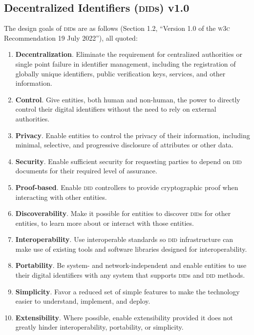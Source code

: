 \documentclass[twoside]{article}
\begin{document}
\subsection{Decentralized Identifiers (\textsc{did}s) v1.0}

The design goals of \textsc{did}s are as follows (Section 1.2, ``Version 1.0 of the \textsc{w3c} Recommendation 19 July 2022''), all quoted:

\begin{enumerate}
  \item  \sloppy \textbf{Decentralization}. Eliminate the requirement for centralized authorities or single point failure in identifier management, including the registration of globally unique identifiers, public verification keys, services, and other information.
  \item  \textbf{Control}. Give entities, both human and non-human, the power to directly control their digital identifiers without the need to rely on external authorities.
  \item  \textbf{Privacy}. Enable entities to control the privacy of their information, including minimal, selective, and progressive disclosure of attributes or other data.
  \item  \textbf{Security}. Enable sufficient security for requesting parties to depend on \textsc{did} documents for their required level of assurance.
  \item  \textbf{Proof-based}. Enable \textsc{did} controllers to provide cryptographic proof when interacting with other entities.
  \item  \textbf{Discoverability}. Make it possible for entities to discover \textsc{did}s for other entities, to learn more about or interact with those entities.
  \item  \textbf{Interoperability}. Use interoperable standards so \textsc{did} infrastructure can make use of existing tools and software libraries designed for interoperability.
  \item  \textbf{Portability}. Be system- and network-independent and enable entities to use their digital identifiers with any system that supports \textsc{did}s and \textsc{did} methods.
  \item  \textbf{Simplicity}. Favor a reduced set of simple features to make the technology easier to understand, implement, and deploy.
  \item  \textbf{Extensibility}. Where possible, enable extensibility provided it does not greatly hinder interoperability, portability, or simplicity.
\end{enumerate}

\printbibliography
\afterpage{\blankpage}
\end{document}

